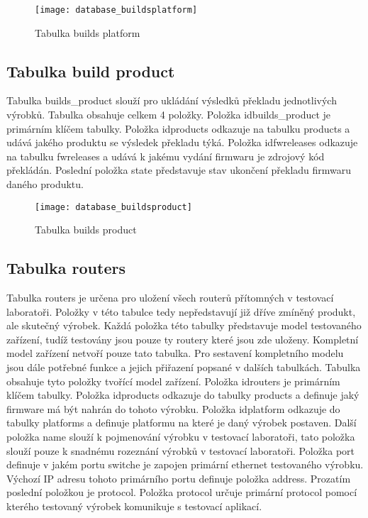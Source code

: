 \begin{figure}[h]
  \centering
  \texttt{[image: database\_buildsplatform]}
  \caption{Tabulka builds platform}
  \label{fig:database_buildsplatform}
\end{figure}

\subsection{Tabulka build product}
Tabulka builds\_product slouží pro ukládání výsledků překladu jednotlivých výrobků. Tabulka obsahuje celkem 4 položky. Položka idbuilds\_product je primárním klíčem tabulky. Položka idproducts odkazuje na tabulku products a udává jakého produktu se výsledek překladu týká. Položka idfwreleases odkazuje na tabulku fwreleases a udává k jakému vydání firmwaru je zdrojový kód překládán. Poslední položka state představuje stav ukončení překladu firmwaru daného produktu.

\begin{figure}[h]
  \centering
  \texttt{[image: database\_buildsproduct]}
  \caption{Tabulka builds product}
  \label{fig:database_buildsproduct}
\end{figure}

\subsection{Tabulka routers}
Tabulka routers je určena pro uložení všech routerů přítomných v testovací laboratoři. Položky v této tabulce tedy nepředstavují již dříve zmíněný produkt, ale skutečný výrobek. Každá položka této tabulky představuje model testovaného zařízení, tudíž testovány jsou pouze ty routery které jsou zde uloženy. Kompletní model zařízení netvoří pouze tato tabulka. Pro sestavení kompletního modelu jsou dále potřebné funkce a jejich přiřazení popsané v dalších tabulkách. Tabulka obsahuje tyto položky tvořící model zařízení. Položka idrouters je primárním klíčem tabulky. Položka idproducts odkazuje do tabulky products a definuje jaký firmware má být nahrán do tohoto výrobku. Položka idplatform odkazuje do tabulky platforms a definuje platformu na které je daný výrobek postaven. Další položka name slouží k pojmenování výrobku v testovací laboratoři, tato položka slouží pouze k snadnému rozeznání výrobků v testovací laboratoři. Položka port definuje v jakém portu switche je zapojen primární ethernet testovaného výrobku. Výchozí IP adresu tohoto primárního portu definuje položka address. Prozatím poslední položkou je protocol. Položka protocol určuje primární protocol pomocí kterého testovaný výrobek komunikuje s testovací aplikací.

